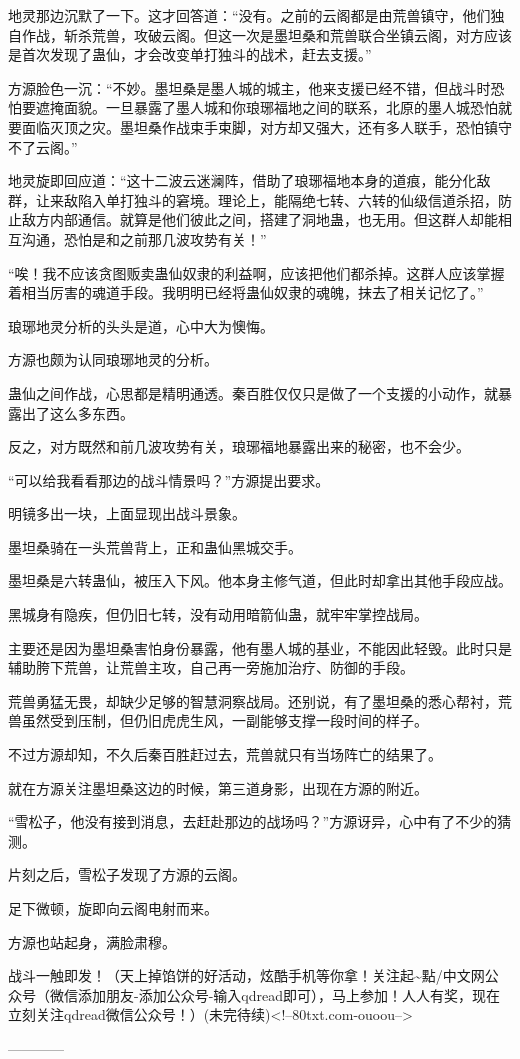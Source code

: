 \begin{this_body}
地灵那边沉默了一下。这才回答道：“没有。之前的云阁都是由荒兽镇守，他们独自作战，斩杀荒兽，攻破云阁。但这一次是墨坦桑和荒兽联合坐镇云阁，对方应该是首次发现了蛊仙，才会改变单打独斗的战术，赶去支援。”

方源脸色一沉：“不妙。墨坦桑是墨人城的城主，他来支援已经不错，但战斗时恐怕要遮掩面貌。一旦暴露了墨人城和你琅琊福地之间的联系，北原的墨人城恐怕就要面临灭顶之灾。墨坦桑作战束手束脚，对方却又强大，还有多人联手，恐怕镇守不了云阁。”

地灵旋即回应道：“这十二波云迷澜阵，借助了琅琊福地本身的道痕，能分化敌群，让来敌陷入单打独斗的窘境。理论上，能隔绝七转、六转的仙级信道杀招，防止敌方内部通信。就算是他们彼此之间，搭建了洞地蛊，也无用。但这群人却能相互沟通，恐怕是和之前那几波攻势有关！”

“唉！我不应该贪图贩卖蛊仙奴隶的利益啊，应该把他们都杀掉。这群人应该掌握着相当厉害的魂道手段。我明明已经将蛊仙奴隶的魂魄，抹去了相关记忆了。”

琅琊地灵分析的头头是道，心中大为懊悔。

方源也颇为认同琅琊地灵的分析。

蛊仙之间作战，心思都是精明通透。秦百胜仅仅只是做了一个支援的小动作，就暴露出了这么多东西。

反之，对方既然和前几波攻势有关，琅琊福地暴露出来的秘密，也不会少。

“可以给我看看那边的战斗情景吗？”方源提出要求。

明镜多出一块，上面显现出战斗景象。

墨坦桑骑在一头荒兽背上，正和蛊仙黑城交手。

墨坦桑是六转蛊仙，被压入下风。他本身主修气道，但此时却拿出其他手段应战。

黑城身有隐疾，但仍旧七转，没有动用暗箭仙蛊，就牢牢掌控战局。

主要还是因为墨坦桑害怕身份暴露，他有墨人城的基业，不能因此轻毁。此时只是辅助胯下荒兽，让荒兽主攻，自己再一旁施加治疗、防御的手段。

荒兽勇猛无畏，却缺少足够的智慧洞察战局。还别说，有了墨坦桑的悉心帮衬，荒兽虽然受到压制，但仍旧虎虎生风，一副能够支撑一段时间的样子。

不过方源却知，不久后秦百胜赶过去，荒兽就只有当场阵亡的结果了。

就在方源关注墨坦桑这边的时候，第三道身影，出现在方源的附近。

“雪松子，他没有接到消息，去赶赴那边的战场吗？”方源讶异，心中有了不少的猜测。

片刻之后，雪松子发现了方源的云阁。

足下微顿，旋即向云阁电射而来。

方源也站起身，满脸肃穆。

战斗一触即发！（天上掉馅饼的好活动，炫酷手机等你拿！关注起\~{}點/中文网公众号（微信添加朋友-添加公众号-输入qdread即可），马上参加！人人有奖，现在立刻关注qdread微信公众号！）(未完待续)<!--80txt.com-ouoou-->

------------

\end{this_body}


